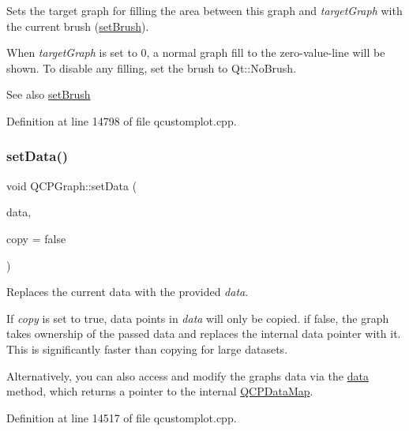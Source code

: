 Sets the target graph for filling the area between this graph and {\itshape target\+Graph} with the current brush (\hyperlink{class_q_c_p_abstract_plottable_a7a4b92144dca6453a1f0f210e27edc74}{set\+Brush}).

When {\itshape target\+Graph} is set to 0, a normal graph fill to the zero-\/value-\/line will be shown. To disable any filling, set the brush to Qt\+::\+No\+Brush.

\begin{DoxySeeAlso}{See also}
\hyperlink{class_q_c_p_abstract_plottable_a7a4b92144dca6453a1f0f210e27edc74}{set\+Brush} 
\end{DoxySeeAlso}


Definition at line 14798 of file qcustomplot.\+cpp.

\mbox{\label{class_q_c_p_graph_a1df2fd710545c8ba3b2c99a39a27bf8b}} 
\subsubsection{\texorpdfstring{set\+Data()}{setData()}\hspace{0.1cm}{\footnotesize\ttfamily [1/2]}}
{\footnotesize\ttfamily void Q\+C\+P\+Graph\+::set\+Data (\begin{DoxyParamCaption}\item[{\hyperlink{qcustomplot_8h_a84a9c4a4c2216ccfdcb5f3067cda76e3}{Q\+C\+P\+Data\+Map} $\ast$}]{data,  }\item[{bool}]{copy = {\ttfamily false} }\end{DoxyParamCaption})}

Replaces the current data with the provided {\itshape data}.

If {\itshape copy} is set to true, data points in {\itshape data} will only be copied. if false, the graph takes ownership of the passed data and replaces the internal data pointer with it. This is significantly faster than copying for large datasets.

Alternatively, you can also access and modify the graph\textquotesingle{}s data via the \hyperlink{class_q_c_p_graph_acde1c0d1f6a817930489548396e6b3e6}{data} method, which returns a pointer to the internal \hyperlink{qcustomplot_8h_a84a9c4a4c2216ccfdcb5f3067cda76e3}{Q\+C\+P\+Data\+Map}. 

Definition at line 14517 of file qcustomplot.\+cpp.

